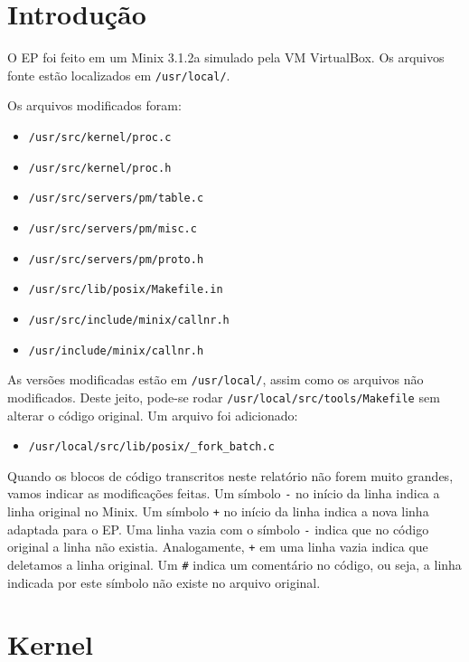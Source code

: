 \documentclass{amsart}
\title[]{\rule{10.5cm}{0.8pt}\\Exercício-Programa 2:\\
Escalonamento de Processos
\\\vspace{2mm}\footnotesize
  Sistemas Operacionais --- MAC0422\\\rule{10cm}{0.8pt}}
\author[]{Renato Lui Geh\\NUSP\@: 8536030\\
          Guilherme Freire\\NUSP\@: 7557373}
\theoremstyle{plain}
\newcommand{\code}[1]{\lstinline[mathescape=true]{#1}}
\begin{document}
\date{\today}
\maketitle

\section{Introdução}

O EP foi feito em um Minix 3.1.2a simulado pela VM VirtualBox. Os arquivos fonte estão localizados
em \code{/usr/local/}.

Os arquivos modificados foram:

\begin{itemize}
  \item \code{/usr/src/kernel/proc.c}
  \item \code{/usr/src/kernel/proc.h}
  \item \code{/usr/src/servers/pm/table.c}
  \item \code{/usr/src/servers/pm/misc.c}
  \item \code{/usr/src/servers/pm/proto.h}
  \item \code{/usr/src/lib/posix/Makefile.in}
  \item \code{/usr/src/include/minix/callnr.h}
  \item \code{/usr/include/minix/callnr.h}
\end{itemize}

As versões modificadas estão em \code{/usr/local/}, assim como os arquivos não modificados. Deste
jeito, pode-se rodar \code{/usr/local/src/tools/Makefile} sem alterar o código original. Um arquivo
foi adicionado:

\begin{itemize}
  \item \code{/usr/local/src/lib/posix/_fork_batch.c}
\end{itemize}

Quando os blocos de código transcritos neste relatório não forem muito grandes, vamos indicar as
modificações feitas. Um símbolo \code{-} no início da linha indica a linha original no Minix. Um
símbolo \code{+} no início da linha indica a nova linha adaptada para o EP\@. Uma linha vazia com o
símbolo \code{-} indica que no código original a linha não existia. Analogamente, \code{+} em uma
linha vazia indica que deletamos a linha original. Um \code{#} indica um comentário no código, ou
seja, a linha indicada por este símbolo não existe no arquivo original.

\section{Kernel}
\end{document}

